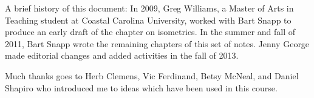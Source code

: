 A brief history of this document: In 2009, Greg Williams, a Master of
Arts in Teaching student at Coastal Carolina University, worked with
Bart Snapp to produce an early draft of the chapter on isometries. In
the summer and fall of 2011, Bart Snapp wrote the remaining chapters of this
set of notes. Jenny George made editorial changes and added activities
 in the fall of 2013.

Much thanks goes to Herb Clemens, Vic Ferdinand, Betsy McNeal, and
Daniel Shapiro who introduced me to ideas which have been used in this
course.



\tableofcontents













